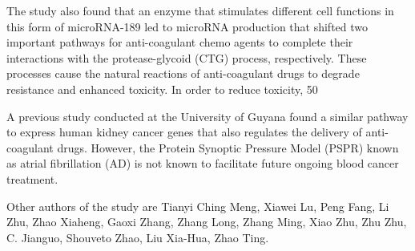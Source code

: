 \documentclass{article}
\begin{document}
The study also found that an enzyme that stimulates different cell functions in this form of microRNA-189 led to microRNA production that shifted two important pathways for anti-coagulant chemo agents to complete their interactions with the protease-glycoid (CTG) process, respectively. These processes cause the natural reactions of anti-coagulant drugs to degrade resistance and enhanced toxicity. In order to reduce toxicity, 50%

A previous study conducted at the University of Guyana found a similar pathway to express human kidney cancer genes that also regulates the delivery of anti-coagulant drugs. However, the Protein Synoptic Pressure Model (PSPR) known as atrial fibrillation (AD) is not known to facilitate future ongoing blood cancer treatment.

Other authors of the study are Tianyi Ching Meng, Xiawei Lu, Peng Fang, Li Zhu, Zhao Xiaheng, Gaoxi Zhang, Zhang Long, Zhang Ming, Xiao Zhu, Zhu Zhu, C. Jianguo, Shouveto Zhao, Liu Xia-Hua, Zhao Ting.
\end{document}
